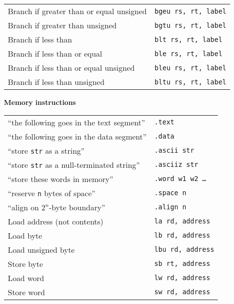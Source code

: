 \documentclass{article}
\newcommand{\pseudo}{{\ensuremath\ast}}
\begin{document}
\begin{center}
\begin{tabular}{ll}
Branch if greater than or equal unsigned\pseudo & {\tt bgeu rs, rt, label} \\
Branch if greater than unsigned\pseudo & {\tt bgtu rs, rt, label} \\
Branch if less than\pseudo & {\tt blt rs, rt, label} \\
Branch if less than or equal\pseudo & {\tt ble rs, rt, label} \\
Branch if less than or equal unsigned\pseudo & {\tt bleu rs, rt, label} \\
Branch if less than unsigned\pseudo & {\tt bltu rs, rt, label} \\
\end{tabular}
\end{center}

\noindent
\textbf{Memory instructions} \\
\begin{center}
\begin{tabular}{ll}
``the following goes in the text segment'' & {\tt .text} \\
``the following goes in the data segment'' & {\tt .data} \\
``store {\tt str} as a string'' & {\tt .ascii str} \\
``store {\tt str} as a null-terminated string'' & {\tt .asciiz str} \\
``store these words in memory'' & {\tt .word w1 w2 \ldots} \\
``reserve {\tt n} bytes of space'' & {\tt .space n} \\
``align on $2^n$-byte boundary'' & {\tt .align n} \\
Load address (not contents) \pseudo & {\tt la rd, address} \\
Load byte & {\tt lb rd, address} \\
Load unsigned byte & {\tt lbu rd, address} \\
Store byte & {\tt sb rt, address} \\
Load word & {\tt lw rd, address} \\
Store word & {\tt sw rd, address} \\
\end{tabular}
\end{center}
\end{document}
